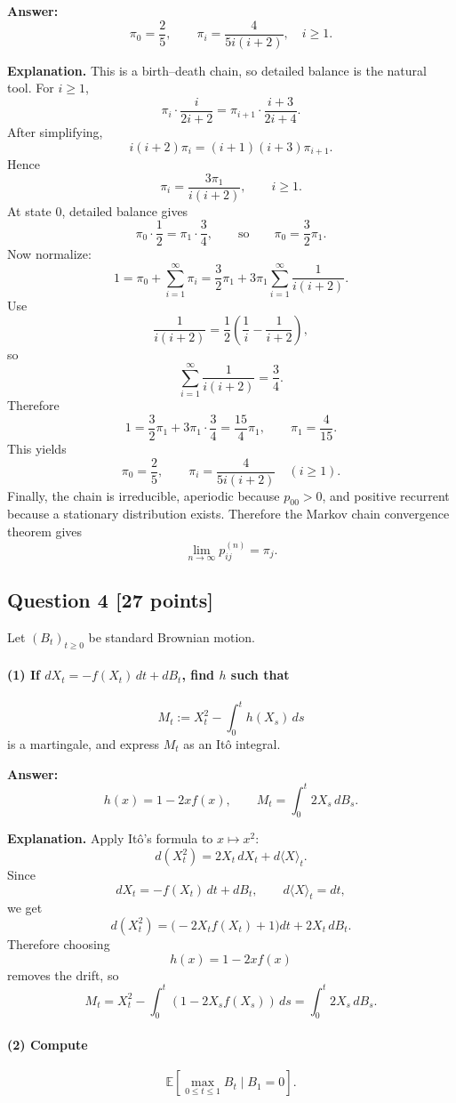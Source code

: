 \documentclass[11pt]{article}
\theoremstyle{definition}
\begin{document}
\textbf{Answer:}
\[
\pi_0=\frac25,
\qquad
\pi_i=\frac{4}{5i(i+2)}, \quad i\ge 1.
\]

\textbf{Explanation.} This is a birth--death chain, so detailed balance is the natural tool. For $i\ge 1$,
\[
\pi_i \cdot \frac{i}{2i+2}
=
\pi_{i+1}\cdot \frac{i+3}{2i+4}.
\]
After simplifying,
\[
 i(i+2)\pi_i=(i+1)(i+3)\pi_{i+1}.
\]
Hence
\[
 \pi_i = \frac{3\pi_1}{i(i+2)}, \qquad i\ge 1.
\]
At state $0$, detailed balance gives
\[
 \pi_0\cdot \frac12 = \pi_1\cdot \frac34,
 \qquad\text{so}\qquad
 \pi_0 = \frac32\pi_1.
\]
Now normalize:
\[
1 = \pi_0 + \sum_{i=1}^{\infty} \pi_i
= \frac32\pi_1 + 3\pi_1\sum_{i=1}^{\infty}\frac{1}{i(i+2)}.
\]
Use
\[
\frac{1}{i(i+2)}=\frac12\left(\frac1i-\frac{1}{i+2}\right),
\]
so
\[
\sum_{i=1}^{\infty}\frac{1}{i(i+2)}=\frac34.
\]
Therefore
\[
1=\frac32\pi_1 + 3\pi_1\cdot \frac34 = \frac{15}{4}\pi_1,
\qquad
\pi_1=\frac{4}{15}.
\]
This yields
\[
\pi_0=\frac25,
\qquad
\pi_i=\frac{4}{5i(i+2)} \quad (i\ge 1).
\]
Finally, the chain is irreducible, aperiodic because $p_{00}>0$, and positive recurrent because a stationary distribution exists. Therefore the Markov chain convergence theorem gives
\[
\lim_{n\to\infty} p_{ij}^{(n)}=\pi_j.
\]

\subsection*{Question 4 \hfill [27 points]}
Let $(B_t)_{t\ge 0}$ be standard Brownian motion.

\paragraph{(1) If $dX_t=-f(X_t)\,dt+dB_t$, find $h$ such that}
\[
M_t:=X_t^2-\int_0^t h(X_s)\,ds
\]
is a martingale, and express $M_t$ as an It\^o integral.

\textbf{Answer:}
\[
 h(x)=1-2xf(x),
 \qquad
 M_t=\int_0^t 2X_s\,dB_s.
\]

\textbf{Explanation.} Apply It\^o's formula to $x\mapsto x^2$:
\[
 d(X_t^2)=2X_t\,dX_t + d\langle X\rangle_t.
\]
Since
\[
 dX_t=-f(X_t)\,dt+dB_t,
 \qquad
 d\langle X\rangle_t=dt,
\]
we get
\[
 d(X_t^2)=\bigl(-2X_t f(X_t)+1\bigr)dt + 2X_t\,dB_t.
\]
Therefore choosing
\[
 h(x)=1-2xf(x)
\]
removes the drift, so
\[
 M_t=X_t^2-\int_0^t (1-2X_s f(X_s))\,ds = \int_0^t 2X_s\,dB_s.
\]

\paragraph{(2) Compute}
\[
\mathbb E\!\left[\max_{0\le t\le 1} B_t \mid B_1=0\right].
\]
\end{document}
